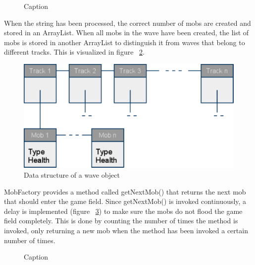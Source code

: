 \begin{figure}[htb]

\begin{small}

\end{small}

\caption{Caption}
\label{fig:codeExMobCreationWave}

\end{figure}

When the string has been processed, the correct number of mobs are created and stored in an ArrayList. When all mobs in the wave have been created, the list of mobs is stored in another ArrayList to distinguish it from waves that belong to different tracks. This is visualized in figure ~\ref{fig:dataStructureWave}.

\begin{figure}[here]

\begin{center}
\includegraphics[scale=0.5]{pics/chapters/chapter4/moblist2}
\end{center}

\caption{Data structure of a wave object}
\label{fig:dataStructureWave}

\end{figure}

MobFactory provides a method called getNextMob() that returns the next mob that should enter the game field. Since getNextMob() is invoked continuously, a delay is implemented (figure ~\ref{fig:codeExWaveDelay}) to make sure the mobs do not flood the game field completely. This is done by counting the number of times the method is invoked, only returning a new mob when the method has been invoked a certain number of times.

\begin{figure}[htb]

\begin{small}

\end{small}

\caption{Caption}
\label{fig:codeExWaveDelay}

\end{figure}


